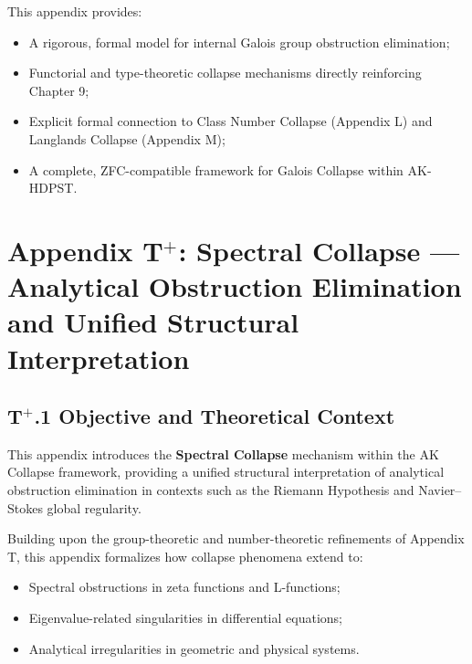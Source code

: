 \documentclass[11pt]{article}
\begin{document}
This appendix provides:

\begin{itemize}
    \item A rigorous, formal model for internal Galois group obstruction elimination;
    \item Functorial and type-theoretic collapse mechanisms directly reinforcing Chapter 9;
    \item Explicit formal connection to Class Number Collapse (Appendix L) and Langlands Collapse (Appendix M);
    \item A complete, ZFC-compatible framework for Galois Collapse within AK-HDPST.
\end{itemize}




\section*{Appendix T$^{+}$: Spectral Collapse — Analytical Obstruction Elimination and Unified Structural Interpretation}

\subsection*{T$^{+}$.1 Objective and Theoretical Context}

This appendix introduces the \textbf{Spectral Collapse} mechanism within the AK Collapse framework, providing a unified structural interpretation of analytical obstruction elimination in contexts such as the Riemann Hypothesis and Navier--Stokes global regularity.

Building upon the group-theoretic and number-theoretic refinements of Appendix T, this appendix formalizes how collapse phenomena extend to:

\begin{itemize}
    \item Spectral obstructions in zeta functions and L-functions;
    \item Eigenvalue-related singularities in differential equations;
    \item Analytical irregularities in geometric and physical systems.
\end{itemize}
\end{document}
